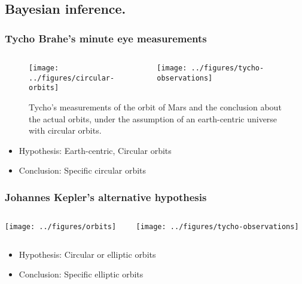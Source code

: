\subsection{Bayesian inference.}
\begin{frame}
  \frametitle{Tycho Brahe's minute eye measurements}
  \begin{figure}[H]
    \centering
    \begin{columns}
      \begin{column}{0.5\textwidth}
        \texttt{[image: ../figures/circular-orbits]}
      \end{column}
      \begin{column}{0.5\textwidth}
        \texttt{[image: ../figures/tycho-observations]}
      \end{column}
    \end{columns}
    
    \caption{Tycho's measurements of the orbit of Mars and the conclusion about the actual orbits, under the assumption of an earth-centric universe with circular orbits.}
    \label{fig:tycho}
  \end{figure}
  \begin{itemize}
  \item Hypothesis: Earth-centric, Circular orbits
  \item Conclusion: \alert{Specific} circular orbits
  \end{itemize}
\end{frame}




\begin{frame}
  \frametitle{Johannes Kepler's alternative hypothesis}
  \begin{columns}
    \centering
    \begin{column}{0.5\textwidth}
      \texttt{[image: ../figures/orbits]}
    \end{column}
    \begin{column}{0.5\textwidth}
      \texttt{[image: ../figures/tycho-observations]}
    \end{column}
  \end{columns}
  \begin{itemize}
  \item Hypothesis: Circular \alert{or} elliptic orbits
  \item Conclusion: Specific \alert{elliptic} orbits
  \end{itemize}
\end{frame}


